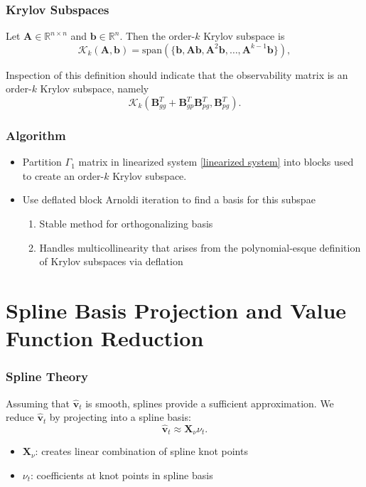 \documentclass{beamer}
\newcommand{\bfb}{\mathbf{b}}
\newcommand{\bfv}{\mathbf{v}}
\newcommand{\bfX}{\mathbf{X}}
\newcommand{\bfA}{\mathbf{A}}
\newcommand{\bfB}{\mathbf{B}}
\newcommand{\R}{\mathbb{R}}
\newcommand{\calK}{\mathcal{K}}
\begin{document}
\begin{frame}
  \frametitle{Krylov Subspaces}
\begin{definition}
Let $\bfA\in \R^{n\times n}$ and $\bfb\in \R^n$. Then the order-$k$ Krylov subspace is
\[ \calK_k(\bfA,\bfb) = \text{span}(\{\bfb, \bfA\bfb, \bfA^2\bfb,\dots, \bfA^{k-1}\bfb\}), \]
\end{definition}
Inspection of this definition should indicate that the observability matrix is an order-$k$ Krylov subspace, namely
\[\calK_k(\bfB_{gg}^T + \bfB_{gp}^T\bfB_{pg}^T, \bfB_{pg}^T).  \]
\end{frame}

\begin{frame}
  \frametitle{Algorithm}
  \begin{itemize}
  \item Partition $\Gamma_1$ matrix in linearized system \eqref{linearized system} into blocks used to create an order-$k$ Krylov subspace.
\item Use deflated block Arnoldi iteration to find a basis for this subspae
  \begin{enumerate}
  \item Stable method for orthogonalizing basis
  \item Handles multicollinearity that arises from the polynomial-esque definition of Krylov subspaces via deflation
  \end{enumerate}
  \end{itemize}
\end{frame}


\section{Spline Basis Projection and Value Function Reduction}

\begin{frame}
\frametitle{Spline Theory}
  Assuming that $\hat{\bfv}_t$ is smooth, splines provide a sufficient approximation. We reduce $\hat{\bfv}_t$ by projecting into a spline basis:
\begin{equation}
  \label{spline projection}
\hat{\bfv}_t \approx \bfX_\nu \nu_t.
\end{equation}
\begin{itemize}
\item $\bfX_\nu$: creates linear combination of spline knot points
\item $\nu_t$: coefficients at knot points in spline basis
\end{itemize}
\end{frame}
\end{document}

